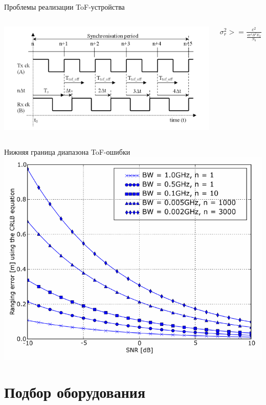 \begin{frame}{Проблемы реализации ToF-устройства}
    \begin{columns}
        \centering
        \includegraphics[width=1.1\linewidth]{../Figures/sync.png}

        \centering
        $\sigma_r^2 >= \frac{c^2}{\frac{4 \pi^2 B^2 E_S}{N_0}}$
    \end{columns}
\end{frame}

\begin{frame}{Нижняя граница диапазона ToF-ошибки}
    \centering
    \includegraphics[width=.8\linewidth]{../Figures/cramer.png}
\end{frame}

\section{Подбор оборудования}

